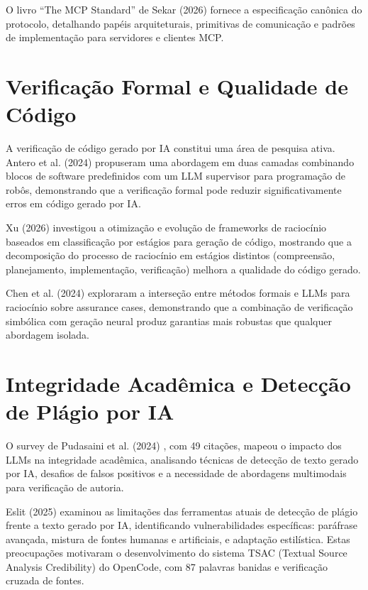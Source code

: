 \documentclass[12pt,a4paper,sumario=tradicional]{abntex2}
\begin{document}
O livro ``The MCP Standard'' de Sekar (2026) \cite{sekarmcp2026} fornece a especificação canônica do protocolo, detalhando papéis arquiteturais, primitivas de comunicação e padrões de implementação para servidores e clientes MCP.

\section{Verificação Formal e Qualidade de Código}

A verificação de código gerado por IA constitui uma área de pesquisa ativa. Antero et al. (2024) \cite{antero2024harnessing} propuseram uma abordagem em duas camadas combinando blocos de software predefinidos com um LLM supervisor para programação de robôs, demonstrando que a verificação formal pode reduzir significativamente erros em código gerado por IA.

Xu (2026) \cite{xu2026optimisation} investigou a otimização e evolução de frameworks de raciocínio baseados em classificação por estágios para geração de código, mostrando que a decomposição do processo de raciocínio em estágios distintos (compreensão, planejamento, implementação, verificação) melhora a qualidade do código gerado.

Chen et al. (2024) \cite{chen2024trusta} exploraram a interseção entre métodos formais e LLMs para raciocínio sobre assurance cases, demonstrando que a combinação de verificação simbólica com geração neural produz garantias mais robustas que qualquer abordagem isolada.

\section{Integridade Acadêmica e Detecção de Plágio por IA}

O survey de Pudasaini et al. (2024) \cite{pudasaini2024survey}, com 49 citações, mapeou o impacto dos LLMs na integridade acadêmica, analisando técnicas de detecção de texto gerado por IA, desafios de falsos positivos e a necessidade de abordagens multimodais para verificação de autoria.

Eslit (2025) \cite{eslit2025ai} examinou as limitações das ferramentas atuais de detecção de plágio frente a texto gerado por IA, identificando vulnerabilidades específicas: paráfrase avançada, mistura de fontes humanas e artificiais, e adaptação estilística. Estas preocupações motivaram o desenvolvimento do sistema TSAC (Textual Source Analysis Credibility) do OpenCode, com 87 palavras banidas e verificação cruzada de fontes.
\end{document}
